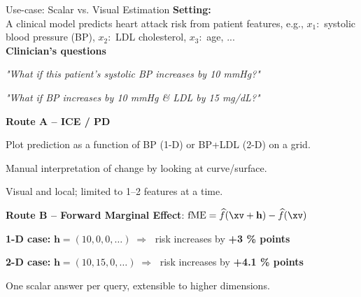 \documentclass[10pt,compress,t,notes=noshow, xcolor=table]{beamer}
\begin{document}
\begin{framev}[align=top]{Use-case: Scalar vs. Visual Estimation}
\textbf{Setting:}\\
A clinical model predicts heart attack risk from patient features, e.g., $x_1:$ systolic blood pressure (BP), $x_2:$ LDL cholesterol, $x_3:$ age, ...
\\
\spacer[0.25]
\textbf{Clinician’s questions}
\begin{itemizeM}
\item \emph{"What if this patient’s systolic BP increases by 10 mmHg?"}
\item \emph{"What if BP increases by 10 mmHg \& LDL by 15 mg/dL?"}
\end{itemizeM}
\spacer[0.25]
\textbf{Route A – ICE / PD}
\begin{itemizeM}
\item Plot prediction as a function of BP (1-D) or BP+LDL (2-D) on a grid.
\item Manual interpretation of change by looking at curve/surface.
\item[$\rightarrow$] Visual and local; limited to 1–2 features at a time.
\end{itemizeM}
\spacer[0.25]
\textbf{Route B – Forward Marginal Effect}: $\mathrm{fME} = \widehat f(\xv + \mathbf{h}) - \widehat f(\xv)$
\begin{itemizeM}
\item \textbf{1-D case:} $\mathbf{h} = (10, 0, 0, \dots) \;\Rightarrow\;$ risk increases by \textbf{+3 \% points}
\item \textbf{2-D case:} $\mathbf{h} = (10, 15, 0, \dots) \;\Rightarrow\;$ risk increases by \textbf{+4.1 \% points}
\item One scalar answer per query, extensible to higher dimensions.
\end{itemizeM}
\end{framev}


\end{document}
